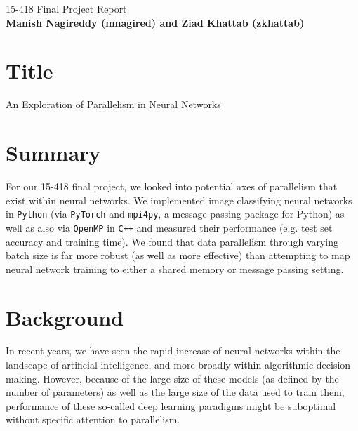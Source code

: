 \documentclass{article}
\begin{document}
\onehalfspacing

\begin{center}

\Large{15-418 Final Project Report} \\
\vspace{1em}
\normalsize\textbf{Manish Nagireddy (mnagired) and Ziad Khattab (zkhattab)} \\
\vspace{1em}

\end{center}

\section*{Title}

An Exploration of Parallelism in Neural Networks

\section{Summary}

For our 15-418 final project, we looked into potential axes of parallelism that exist within neural networks. We implemented image classifying neural networks in \texttt{Python} (via \texttt{PyTorch} and \texttt{mpi4py}, a message passing package for Python) as well as also via \texttt{OpenMP} in \texttt{C++} and measured their performance (e.g. test set accuracy and training time). We found that data parallelism through varying batch size is far more robust (as well as more effective) than attempting to map neural network training to either a shared memory or message passing setting.

\section{Background}

In recent years, we have seen the rapid increase of neural networks within the landscape of artificial intelligence, and more broadly within algorithmic decision making. However, because of the large size of these models (as defined by the number of parameters) as well as the large size of the data used to train them, performance of these so-called deep learning paradigms might be suboptimal without specific attention to parallelism.
\end{document}
